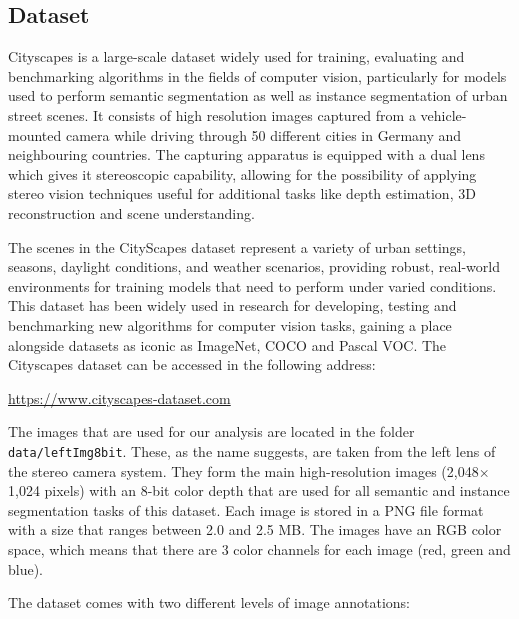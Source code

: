 \subsection{Dataset}

Cityscapes is a large-scale dataset widely used for training, evaluating and benchmarking algorithms in the fields of computer vision, particularly for models used to perform semantic segmentation as well as instance segmentation of urban street scenes. It consists of high resolution images captured from a vehicle-mounted camera while driving through 50 different cities in Germany and neighbouring countries. The capturing apparatus is equipped with a dual lens which gives it stereoscopic capability, allowing for the possibility of applying stereo vision techniques useful for additional tasks like depth estimation, 3D reconstruction and scene understanding. 

The scenes in the CityScapes dataset represent a variety of urban settings, seasons, daylight conditions, and weather scenarios, providing robust, real-world environments for training models that need to perform under varied conditions. This dataset has been widely used in research for developing, testing and benchmarking new algorithms for computer vision tasks, gaining a place alongside datasets as iconic as ImageNet, COCO and Pascal VOC. The Cityscapes dataset can be accessed in the following address:
\begin{center}
\url{https://www.cityscapes-dataset.com}
\end{center}

The images that are used for our analysis are located in the folder \small\texttt{data/leftImg8bit}. These, as the name suggests, are taken from the left lens of the stereo camera system. They form the main high-resolution images (2,048$\times$1,024 pixels) with an 8-bit color depth that are used for all semantic and instance segmentation tasks of this dataset. Each image is stored in a PNG file format with a size that ranges between 2.0 and 2.5 MB. The images have an RGB color space, which means that there are 3 color channels for each image (red, green and blue).

The dataset comes with two different levels of image annotations:

